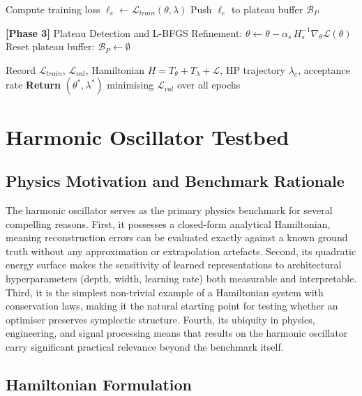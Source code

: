 \documentclass[12pt,a4paper]{article}
\begin{document}
\begin{algorithm}[tb]
\begin{algorithmic}[1]
  \State Compute training loss $\ell_e \leftarrow \mathcal{L}_{train}(\theta,\lambda)$
  \State Push $\ell_e$ to plateau buffer $\mathcal{B}_P$

  \State \textbf{[Phase 3]} Plateau Detection and L-BFGS Refinement:
      \State $\theta \leftarrow \theta - \alpha_s\,H_s^{-1}\nabla_\theta\mathcal{L}(\theta)$
    \EndFor
    \State Reset plateau buffer: $\mathcal{B}_P \leftarrow \emptyset$
  \EndIf

  \State Record $\mathcal{L}_{train}$, $\mathcal{L}_{val}$,
         Hamiltonian $H = T_\theta+T_\lambda+\mathcal{L}$,
         HP trajectory $\lambda_e$, acceptance rate
\EndFor
\State \textbf{Return} $(\theta^*, \lambda^*)$ minimising $\mathcal{L}_{val}$ over all epochs
\end{algorithmic}
\end{algorithm}

\newpage
\section{Harmonic Oscillator Testbed}

\subsection{Physics Motivation and Benchmark Rationale}

The harmonic oscillator serves as the primary physics benchmark for
several compelling reasons.  First, it possesses a closed-form
analytical Hamiltonian, meaning reconstruction errors can be evaluated
exactly against a known ground truth without any approximation or
extrapolation artefacts.  Second, its quadratic energy surface makes the
sensitivity of learned representations to architectural hyperparameters
(depth, width, learning rate) both measurable and interpretable.  Third,
it is the simplest non-trivial example of a Hamiltonian system with
conservation laws, making it the natural starting point for testing
whether an optimiser preserves symplectic structure.  Fourth, its
ubiquity in physics, engineering, and signal processing means that
results on the harmonic oscillator carry significant practical relevance
beyond the benchmark itself.

\subsection{Hamiltonian Formulation}
\end{document}
